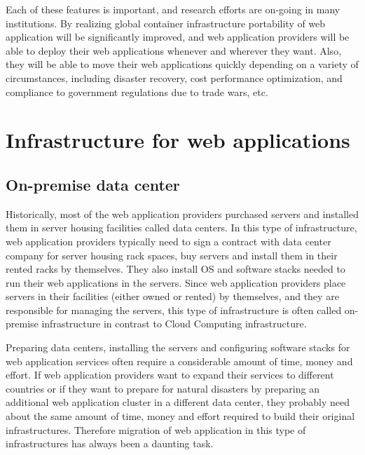 Each of these features is important, and research efforts are on-going in many institutions.
%
By realizing global container infrastructure portability of web application will be significantly improved, and web application providers will be able to deploy their web applications whenever and wherever they want.
Also, they will be able to move their web applications quickly depending on a variety of circumstances, including disaster recovery, cost performance optimization, and compliance to government regulations due to trade wars, etc.

\section{Infrastructure for web applications}

\subsection{On-premise data center}

Historically, most of the web application providers purchased servers and installed them in server housing facilities called data centers.
In this type of infrastructure, web application providers typically need to sign a contract with data center company for server housing rack spaces, buy servers and install them in their rented racks by themselves.
They also install OS and software stacks needed to run their web applications in the servers.
Since web application providers place servers in their facilities (either owned or rented) by themselves, and they are responsible for managing the servers, this type of infrastructure is often called on-premise infrastructure in contrast to Cloud Computing infrastructure.

Preparing data centers, installing the servers and configuring software stacks for web application services often require a considerable amount of time, money and effort.
If web application providers want to expand their services to different countries or if they want to prepare for natural disasters by preparing an additional web application cluster in a different data center, they probably need about the same amount of time, money and effort required to build their original infrastructures.
Therefore migration of web application in this type of infrastructures has always been a daunting task.

